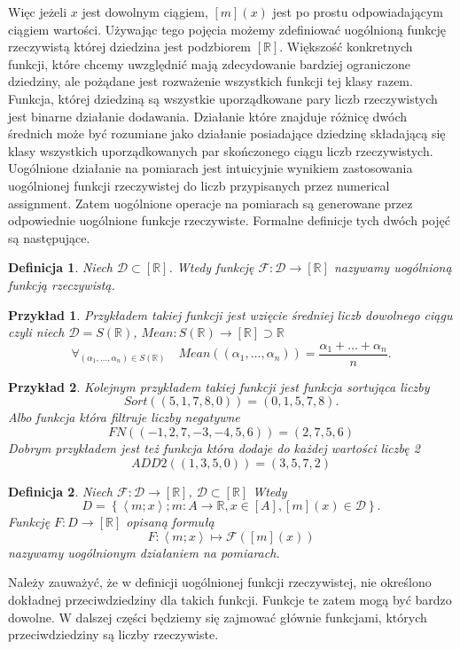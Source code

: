\documentclass[12pt,a4paper]{report}
\newtheorem{definition}{Definicja}[chapter]
\newtheorem{przyklad}{Przykład}
\newcommand{\parauporzadkowana}[2]{\left\langle {#1}; {#2} \right\rangle}
\newcommand{\zbior}[1]{\left\lbrace {#1} \right\rbrace }
\newcommand{\domkniecie}[1]{\left\lbrack{#1}\right\rbrack}
\begin{document}
Więc jeżeli $x$ jest dowolnym ciągiem, $\domkniecie{m}(x)$ jest po prostu odpowiadającym ciągiem wartości. Używając tego pojęcia możemy zdefiniować uogólnioną funkcję rzeczywistą której dziedzina jest podzbiorem $\domkniecie{\mathbb{R}}$. Większość konkretnych funkcji, które chcemy uwzględnić mają zdecydowanie bardziej ograniczone dziedziny, ale pożądane jest rozważenie wszystkich funkcji tej klasy razem. Funkcja, której dziedziną są wszystkie uporządkowane pary liczb rzeczywistych jest binarne działanie dodawania. Działanie które znajduje różnicę dwóch średnich może być rozumiane jako działanie posiadające dziedzinę składającą się klasy wszystkich uporządkowanych par skończonego ciągu liczb rzeczywistych. Uogólnione działanie na pomiarach jest intuicyjnie wynikiem zastosowania uogólnionej funkcji rzeczywistej  do liczb przypisanych przez numerical assignment. Zatem uogólnione operacje na pomiarach są generowane przez odpowiednie uogólnione funkcje rzeczywiste. Formalne definicje tych dwóch pojęć są następujące.
\begin{definition}
Niech $\mathcal{D}\subset \domkniecie{\mathbb{R}}$. Wtedy funkcję $\mathcal{F}:\mathcal{D}\to \domkniecie{\mathbb{R}}$ nazywamy uogólnioną funkcją rzeczywistą.
\end{definition}
\begin{przyklad}
Przykładem takiej funkcji jest wzięcie średniej  liczb dowolnego ciągu czyli niech $\mathcal{D}=S(\mathbb{R})$, $Mean: S(\mathbb{R})\to \domkniecie{\mathbb{R}}\supset \mathbb{R}$
$$
\forall_{(\alpha_1,\dots,\alpha_n)\in S(\mathbb{R})} \quad Mean((\alpha_1,\dots,\alpha_n))=\frac{\alpha_1+\dots+\alpha_n}{n}.
$$
\end{przyklad}
\begin{przyklad}
Kolejnym przykładem takiej funkcji jest funkcja sortująca liczby
$$
Sort((5,1,7,8,0))=(0,1,5,7,8).
$$
Albo funkcja która filtruje liczby negatywne
$$
FN((-1,2,7,-3,-4,5,6))=(2,7,5,6)
$$
Dobrym przykładem jest też funkcja która dodaje do każdej wartości liczbę 2
$$
ADD2((1,3,5,0))=(3,5,7,2)
$$
\end{przyklad}
\begin{definition}
Niech $\mathcal{F}:\mathcal{D}\to \domkniecie{\mathbb{R}}$, $\mathcal{D}\subset\domkniecie{\mathbb{R}}$ Wtedy
$$
D=\zbior{\parauporzadkowana{m}{x}; m:A\to \mathbb{R}, x\in \domkniecie{A}, \domkniecie{m}(x)\in \mathcal{D}}.
$$
Funkcję $F:D\to\domkniecie{\mathbb{R}}$ opisaną formułą
$$
F:\parauporzadkowana{m}{x}\longmapsto\mathcal{F}(\domkniecie{m}(x))
$$
nazywamy uogólnionym działaniem na pomiarach.
\end{definition}
Należy zauważyć, że w definicji uogólnionej funkcji rzeczywistej, nie określono dokładnej przeciwdziedziny dla takich funkcji. Funkcje te zatem mogą być bardzo dowolne. W dalszej części będziemy się zajmować głównie funkcjami, których przeciwdziedziny są liczby rzeczywiste. 
\end{document}
